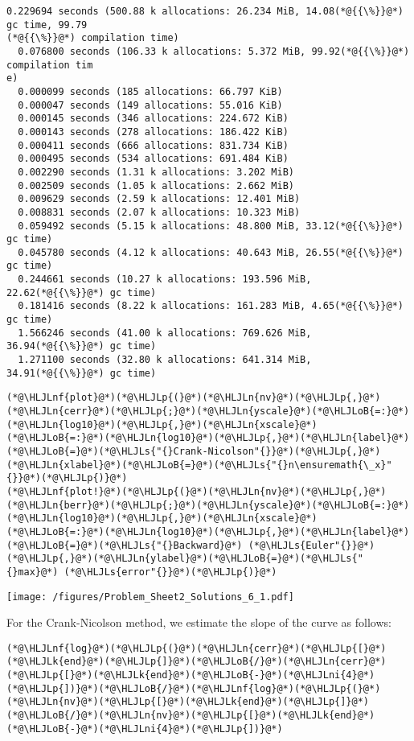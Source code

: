 \documentclass[12pt,a4paper]{article}
\newcommand{\HLJLk}[1]{\textcolor[RGB]{148,91,176}{\textbf{#1}}}
\newcommand{\HLJLn}[1]{#1}
\newcommand{\HLJLnf}[1]{\textcolor[RGB]{66,102,213}{#1}}
\newcommand{\HLJLs}[1]{\textcolor[RGB]{201,61,57}{#1}}
\newcommand{\HLJLni}[1]{\textcolor[RGB]{59,151,46}{#1}}
\newcommand{\HLJLoB}[1]{\textcolor[RGB]{102,102,102}{\textbf{#1}}}
\newcommand{\HLJLp}[1]{#1}
\begin{document}
\begin{lstlisting}
0.229694 seconds (500.88 k allocations: 26.234 MiB, 14.08(*@{{\%}}@*) gc time, 99.79
(*@{{\%}}@*) compilation time)
  0.076800 seconds (106.33 k allocations: 5.372 MiB, 99.92(*@{{\%}}@*) compilation tim
e)
  0.000099 seconds (185 allocations: 66.797 KiB)
  0.000047 seconds (149 allocations: 55.016 KiB)
  0.000145 seconds (346 allocations: 224.672 KiB)
  0.000143 seconds (278 allocations: 186.422 KiB)
  0.000411 seconds (666 allocations: 831.734 KiB)
  0.000495 seconds (534 allocations: 691.484 KiB)
  0.002290 seconds (1.31 k allocations: 3.202 MiB)
  0.002509 seconds (1.05 k allocations: 2.662 MiB)
  0.009629 seconds (2.59 k allocations: 12.401 MiB)
  0.008831 seconds (2.07 k allocations: 10.323 MiB)
  0.059492 seconds (5.15 k allocations: 48.800 MiB, 33.12(*@{{\%}}@*) gc time)
  0.045780 seconds (4.12 k allocations: 40.643 MiB, 26.55(*@{{\%}}@*) gc time)
  0.244661 seconds (10.27 k allocations: 193.596 MiB, 22.62(*@{{\%}}@*) gc time)
  0.181416 seconds (8.22 k allocations: 161.283 MiB, 4.65(*@{{\%}}@*) gc time)
  1.566246 seconds (41.00 k allocations: 769.626 MiB, 36.94(*@{{\%}}@*) gc time)
  1.271100 seconds (32.80 k allocations: 641.314 MiB, 34.91(*@{{\%}}@*) gc time)
\end{lstlisting}


\begin{lstlisting}
(*@\HLJLnf{plot}@*)(*@\HLJLp{(}@*)(*@\HLJLn{nv}@*)(*@\HLJLp{,}@*)(*@\HLJLn{cerr}@*)(*@\HLJLp{;}@*)(*@\HLJLn{yscale}@*)(*@\HLJLoB{=:}@*)(*@\HLJLn{log10}@*)(*@\HLJLp{,}@*)(*@\HLJLn{xscale}@*)(*@\HLJLoB{=:}@*)(*@\HLJLn{log10}@*)(*@\HLJLp{,}@*)(*@\HLJLn{label}@*)(*@\HLJLoB{=}@*)(*@\HLJLs{"{}Crank-Nicolson"{}}@*)(*@\HLJLp{,}@*)(*@\HLJLn{xlabel}@*)(*@\HLJLoB{=}@*)(*@\HLJLs{"{}n\ensuremath{\_x}"{}}@*)(*@\HLJLp{)}@*)
(*@\HLJLnf{plot!}@*)(*@\HLJLp{(}@*)(*@\HLJLn{nv}@*)(*@\HLJLp{,}@*)(*@\HLJLn{berr}@*)(*@\HLJLp{;}@*)(*@\HLJLn{yscale}@*)(*@\HLJLoB{=:}@*)(*@\HLJLn{log10}@*)(*@\HLJLp{,}@*)(*@\HLJLn{xscale}@*)(*@\HLJLoB{=:}@*)(*@\HLJLn{log10}@*)(*@\HLJLp{,}@*)(*@\HLJLn{label}@*)(*@\HLJLoB{=}@*)(*@\HLJLs{"{}Backward}@*) (*@\HLJLs{Euler"{}}@*)(*@\HLJLp{,}@*)(*@\HLJLn{ylabel}@*)(*@\HLJLoB{=}@*)(*@\HLJLs{"{}max}@*) (*@\HLJLs{error"{}}@*)(*@\HLJLp{)}@*)
\end{lstlisting}

\texttt{[image: /figures/Problem\_Sheet2\_Solutions\_6\_1.pdf]}

For the Crank-Nicolson method, we estimate the slope of the curve as follows:


\begin{lstlisting}
(*@\HLJLnf{log}@*)(*@\HLJLp{(}@*)(*@\HLJLn{cerr}@*)(*@\HLJLp{[}@*)(*@\HLJLk{end}@*)(*@\HLJLp{]}@*)(*@\HLJLoB{/}@*)(*@\HLJLn{cerr}@*)(*@\HLJLp{[}@*)(*@\HLJLk{end}@*)(*@\HLJLoB{-}@*)(*@\HLJLni{4}@*)(*@\HLJLp{])}@*)(*@\HLJLoB{/}@*)(*@\HLJLnf{log}@*)(*@\HLJLp{(}@*)(*@\HLJLn{nv}@*)(*@\HLJLp{[}@*)(*@\HLJLk{end}@*)(*@\HLJLp{]}@*)(*@\HLJLoB{/}@*)(*@\HLJLn{nv}@*)(*@\HLJLp{[}@*)(*@\HLJLk{end}@*)(*@\HLJLoB{-}@*)(*@\HLJLni{4}@*)(*@\HLJLp{])}@*)
\end{lstlisting}
\end{document}
